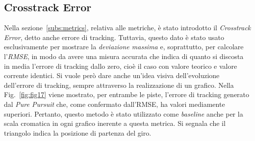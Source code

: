 

\subsection{Crosstrack Error}
Nella sezione~\ref{subs:metrics}, relativa alle metriche, è stato introdotto il 
\textit{Crosstrack Error}, detto anche errore di tracking. Tuttavia, questo dato è stato usato
esclusivamente per mostrare la \textit{deviazione massima} e, soprattutto, per calcolare l'\textit{RMSE}, in 
modo da avere una misura accurata che indica di quanto si discosta in media l'errore di tracking 
dallo zero, cioè il caso con valore teorico e valore corrente identici. 
Si vuole però dare anche un'idea visiva dell'evoluzione dell'errore di tracking, sempre attraverso la realizzazione di un grafico. 
Nella Fig.~\ref{fig:fig17} viene mostrato, per entrambe le piste, l'errore di tracking generato 
dal \textit{Pure Pursuit} che, come confermato dall'RMSE, ha valori mediamente superiori. 
Pertanto, questo metodo è stato utilizzato come \textit{baseline} anche per la scala cromatica in 
ogni grafico inerente a questa metrica. Si segnala che il triangolo indica la posizione di partenza del giro.

